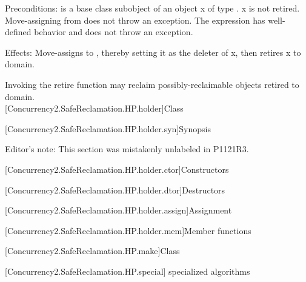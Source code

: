 \pnum
Preconditions:  is a base class subobject of an object x of type . x is not retired.
Move-assigning  from  does not throw an exception. The expression  has well-defined behavior and does not throw an exception.

\pnum
Effects: Move-assigns  to , thereby setting it as the deleter of x, then retires x
to domain.

\pnum
Invoking the retire function may reclaim possibly-reclaimable objects retired to domain.
\\

[Concurrency2.SafeReclamation.HP.holder]{Class }

[Concurrency2.SafeReclamation.HP.holder.syn]{Synopsis}

Editor's note: This section was mistakenly unlabeled in P1121R3.

[Concurrency2.SafeReclamation.HP.holder.ctor]{Constructors}

[Concurrency2.SafeReclamation.HP.holder.dtor]{Destructors}

[Concurrency2.SafeReclamation.HP.holder.assign]{Assignment}

[Concurrency2.SafeReclamation.HP.holder.mem]{Member functions}

[Concurrency2.SafeReclamation.HP.make]{Class }

[Concurrency2.SafeReclamation.HP.special]{ specialized algorithms}
